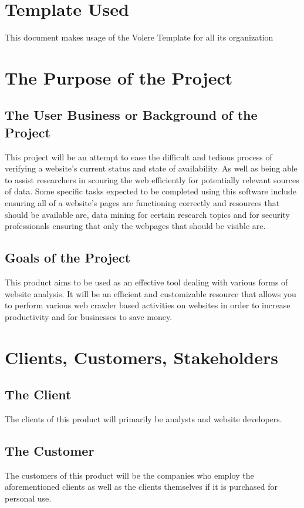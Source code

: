 \documentclass[titlepage]{article}
\begin{document}
\section *{Template Used}
This document makes usage of the Volere Template for all its organization



\section{The Purpose of the Project}

\subsection*{The User Business or Background of the Project}
This project will be an attempt to ease the difficult and tedious process of verifying a website’s current status and state of availability. As well as being able to assist researchers in scouring the web efficiently for potentially relevant sources of data. Some specific tasks expected to be completed using this software include ensuring all of a website’s pages are functioning correctly and resources that should be available are, data mining for certain research topics and for security professionals ensuring that only the webpages that should be visible are.

\subsection*{Goals of the Project}
This product aims to be used as an effective tool dealing with various forms of website analysis. It will be an efficient and customizable resource that allows you to perform various web crawler based activities on websites in order to increase productivity and for businesses to save money.


\section{Clients, Customers, Stakeholders}

\subsection*{The Client}
The clients of this product will primarily be analysts and website developers.

\subsection*{The Customer}
The customers of this product will be the companies who employ the aforementioned clients as well as the clients themselves if it is purchased for personal use.
\end{document}
